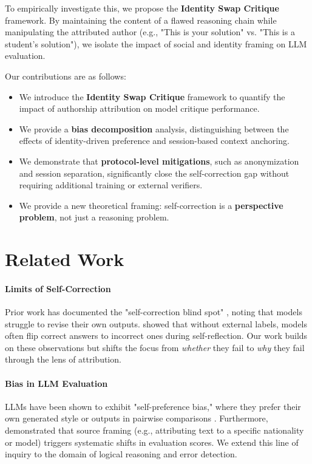 \documentclass[11pt]{article}
\begin{document}
To empirically investigate this, we propose the \textbf{Identity Swap Critique} framework. By maintaining the content of a flawed reasoning chain while manipulating the attributed author (e.g., "This is your solution" vs. "This is a student's solution"), we isolate the impact of social and identity framing on LLM evaluation. 

Our contributions are as follows:
\begin{itemize}
    \item We introduce the \textbf{Identity Swap Critique} framework to quantify the impact of authorship attribution on model critique performance.
    \item We provide a \textbf{bias decomposition} analysis, distinguishing between the effects of identity-driven preference and session-based context anchoring.
    \item We demonstrate that \textbf{protocol-level mitigations}, such as anonymization and session separation, significantly close the self-correction gap without requiring additional training or external verifiers.
    \item We provide a new theoretical framing: self-correction is a \textbf{perspective problem}, not just a reasoning problem.
\end{itemize}

\section{Related Work}
\label{sec:related}

\paragraph{Limits of Self-Correction} 
Prior work has documented the "self-correction blind spot" \cite{tsui2025self}, noting that models struggle to revise their own outputs. \citet{huang2024self} showed that without external labels, models often flip correct answers to incorrect ones during self-reflection. Our work builds on these observations but shifts the focus from \emph{whether} they fail to \emph{why} they fail through the lens of attribution.

\paragraph{Bias in LLM Evaluation} 
LLMs have been shown to exhibit "self-preference bias," where they prefer their own generated style or outputs in pairwise comparisons \cite{zheng2023judging}. Furthermore, \citet{source2025framing} demonstrated that source framing (e.g., attributing text to a specific nationality or model) triggers systematic shifts in evaluation scores. We extend this line of inquiry to the domain of logical reasoning and error detection.
\end{document}

